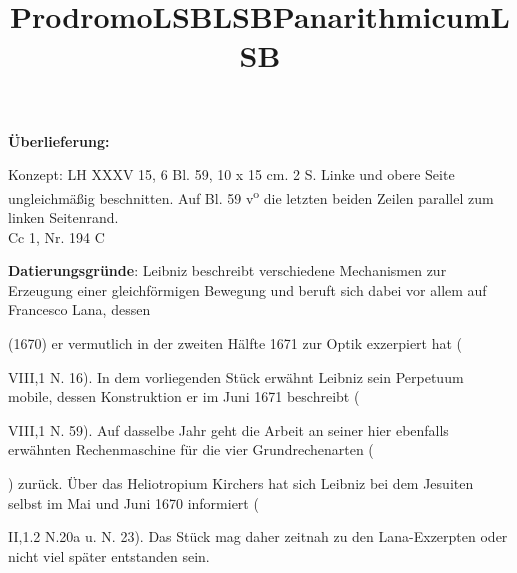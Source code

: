 ﻿      
               
                \begin{ledgroupsized}[r]{120mm}
                \footnotesize 
                \pstart                
                \noindent\textbf{\"{U}berlieferung:}   
                \pend
                \end{ledgroupsized}
            
              
                            \begin{ledgroupsized}[r]{114mm}
                            \footnotesize 
                            \pstart \parindent -6mm
                            Konzept: LH XXXV 15, 6 Bl. 59, 10 x 15 cm. 2 S. Linke und obere Seite ungleichm\"{a}{\ss}ig beschnitten. Auf Bl. 59 v\textsuperscript{o} die letzten beiden Zeilen parallel zum linken Seitenrand.\\Cc 1, Nr. 194 C \pend
                            \end{ledgroupsized}
                \vspace*{5mm}
                \begin{ledgroup}
                \footnotesize 
                \pstart
            \noindent\footnotesize{\textbf{Datierungsgr\"{u}nde}: Leibniz beschreibt verschiedene Mechanismen zur Erzeugung einer gleichf\"{o}rmigen Bewegung und beruft sich dabei vor allem auf Francesco Lana, dessen \title[115]{Prodromo} (1670) er vermutlich in der zweiten H\"{a}lfte 1671 zur Optik exzerpiert hat (\title[115]{LSB} VIII,1 N. 16). In dem vorliegenden St\"{u}ck erw\"{a}hnt Leibniz sein Perpetuum mobile, dessen Konstruktion er im Juni 1671 beschreibt (\title[115]{LSB} VIII,1 N. 59). Auf dasselbe Jahr geht die Arbeit an seiner hier ebenfalls erw\"{a}hnten Rechenmaschine für die vier Grundrechenarten (\title[115]{Panarithmicum}) zurück. Über das Heliotropium Kirchers hat sich Leibniz bei dem Jesuiten selbst im Mai und Juni 1670  informiert (\title[115]{LSB} II,1.2 N.20a u. N. 23). Das Stück mag daher zeitnah zu den Lana-Exzerpten oder nicht viel später entstanden sein.}
                \pend
                \end{ledgroup}
            
